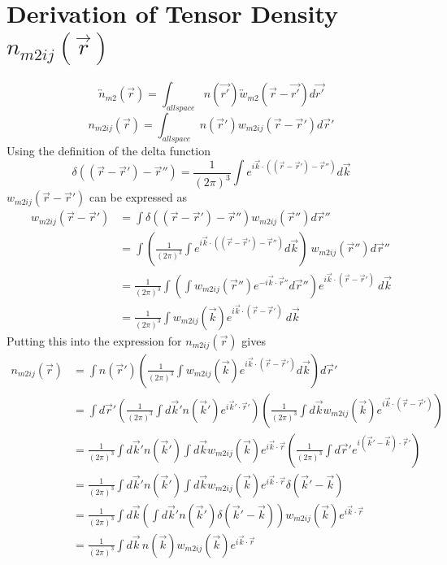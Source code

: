 \documentclass[double,12pt]{beavtex}
\begin{document}
\section{Derivation of Tensor Density $n_{m2ij}(\vec{r})$}
\begin{equation}{\overleftrightarrow{n}_{m2}(\vec{r})=\int_{allspace}n(\vec{r'})\overleftrightarrow{w}_{m2}(\vec{r}-\vec{r'})d{\vec{r'}}}\end{equation} 
\begin{equation}{n_{m2ij}(\vec{r})=\int_{allspace}{n(\vec{r}')w_{m2ij}(\vec{r}-\vec{r}'){}d{\vec{r}'}}}\end{equation}
Using the definition of the delta function
\begin{equation}{\delta}((\vec{r}-\vec{r}')-\vec{r}'')={ \frac{1}{\left(2\pi\right)^3}\int e^{i\vec k\cdot ((\vec r-\vec r')-\vec{r}'')}d\vec{k}}\end{equation} 
$w_{m2ij}(\vec{r}-\vec{r}')$ can be expressed as
\begin{align}
    w_{m2ij}(\vec{r}-\vec{r}') &= \int{\delta((\vec{r}-\vec{r}')-\vec{r}'')w_{m2ij}(\vec{r}''){}d{\vec{r}''}} \\
    &= \int{\left(\frac{1}{\left(2\pi\right)^3}\int e^{i\vec k\cdot((\vec r-\vec r')-\vec{r}'')}d\vec{k}\right){~}w_{m2ij}(\vec{r}''){}d{\vec{r}''}} \\
    &= \frac{1}{\left(2\pi\right)^3}\int{\left(\int w_{m2ij}(\vec{r}'')e^{-i\vec k\cdot\vec{r}''}d\vec{r}''\right)e^{i\vec k\cdot(\vec r-\vec r')}{~}{}d{\vec{k}}} \\
    &= \frac{1}{\left(2\pi\right)^3}\int{w_{m2ij}(\vec k)e^{i\vec k\cdot(\vec r-\vec r')}{~}{}d{\vec{k}}} 
  \end{align} 
Putting this into the expression for $n_{m2ij}(\vec{r})$ gives 
\begin{align}
    n_{m2ij}(\vec r) &= \int n(\vec r') \left(\frac{1}{\left(2\pi\right)^3}\int w_{m2ij}(\vec k)e^{i\vec k\cdot (\vec r-\vec r')}d\vec{k}\right)d\vec r' \\
    &= \int d\vec r' \left(\frac{1}{\left(2\pi\right)^3}\int d\vec k' n(\vec k')e^{i\vec k'\cdot \vec r'}\right) \left(\frac{1}{\left(2\pi\right)^3}\int d\vec k w_{m2ij}(\vec k)e^{i\vec k\cdot (\vec r-\vec r')}\right) \\
    &=  \frac{1}{\left(2\pi\right)^3}\int d\vec k' n(\vec k') \int d\vec k w_{m2ij}(\vec k)
    e^{i\vec k\cdot \vec r}\left(\frac{1}{\left(2\pi\right)^3}\int d\vec r'e^{i(\vec k'-\vec k)\cdot \vec r'}\right)
    \\
   &= \frac{1}{\left(2\pi\right)^3}\int d\vec k' n(\vec k') \int d\vec k w_{m2ij}(\vec k)e^{i\vec k\cdot \vec r}\delta(\vec k'-\vec k) \\
    &= \frac{1}{\left(2\pi\right)^3}\int d\vec k \left(\int d\vec k' n(\vec k')\delta(\vec k'-\vec k)\right) w_{m2ij}(\vec k)e^{i\vec k\cdot \vec r}
    \\
    &= \frac{1}{\left(2\pi\right)^3}\int d\vec k\, n(\vec k) w_{m2ij}(\vec k)e^{i\vec k\cdot \vec r}
  \end{align} 
\end{document}
